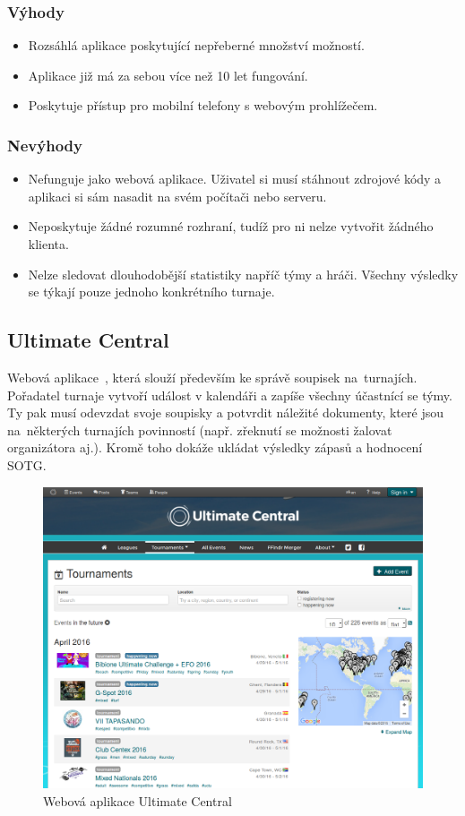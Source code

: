 \subsubsection*{Výhody}
\begin{itemize}
  \item Rozsáhlá aplikace poskytující nepřeberné množství možností.
  \item Aplikace již má za sebou více než 10 let fungování.
  \item Poskytuje přístup pro mobilní telefony s webovým prohlížečem.
\end{itemize}

\subsubsection*{Nevýhody}
\begin{itemize}
  \item Nefunguje jako webová aplikace. Uživatel si musí stáhnout zdrojové kódy a aplikaci si sám nasadit na svém počítači nebo serveru.
  \item Neposkytuje žádné rozumné rozhraní, tudíž pro ni nelze vytvořit žádného klienta.
  \item Nelze sledovat dlouhodobější statistiky napříč týmy a hráči. Všechny výsledky se týkají pouze jednoho konkrétního turnaje.
\end{itemize}

\subsection*{Ultimate Central}

Webová aplikace~\cite{ultimate_central}, která slouží především ke správě soupisek na~turnajích. Pořadatel turnaje vytvoří událost
v kalendáři a zapíše všechny účastnící se týmy. Ty pak musí odevzdat svoje soupisky a potvrdit náležité dokumenty,
které jsou na~některých turnajích povinností (např. zřeknutí se možnosti žalovat organizátora aj.).
Kromě toho dokáže ukládat výsledky zápasů a hodnocení SOTG. 

\begin{figure}[ht!]
\centering
\includegraphics[width=130mm]{./images/ultimate-central.png}
\caption{Webová aplikace Ultimate Central\label{overflow}}
\end{figure}

